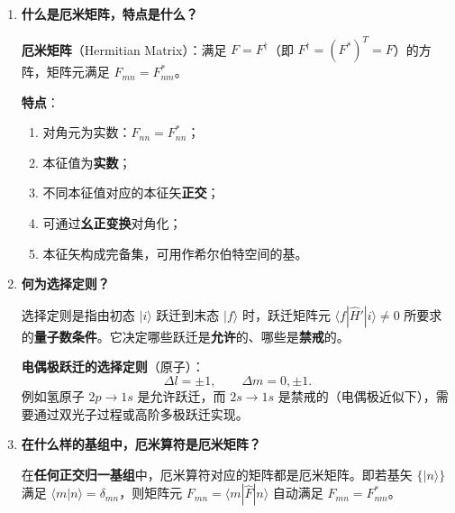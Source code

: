 \begin{enumerate}[label=\textbf{\arabic*.}, leftmargin=2em, itemsep=0.8em]
\textbf{不一定}。若 $[\hat{A},\hat{B}]=0$，则 $\hat{A}$ 和 $\hat{B}$ 具有\textbf{完备的共同本征函数系}，\textbf{原则上}可以同时被精确测定。但"同时确定"还取决于体系所处的\textbf{具体状态}：
\begin{itemize}[nosep]
    \item 若体系处于 $\hat{A}$ 和 $\hat{B}$ 的某个\textbf{共同本征态}，则两者同时具有确定值；
    \item 若体系处于叠加态（如 $\hat{A}$ 存在简并，态是若干简并本征态的叠加），则即使 $[\hat{A},\hat{B}]=0$，$\hat{B}$ 也可能不确定。
\end{itemize}
简言之：对易保证\textbf{可以}同时测定，不等于\textbf{一定}同时确定——后者取决于态的具体形式。

\item \textbf{什么是厄米矩阵，特点是什么？}

\textbf{厄米矩阵}（Hermitian Matrix）：满足 $F = F^\dagger$（即 $F^\dagger = (F^*)^T = F$）的方阵，矩阵元满足 $F_{mn} = F_{nm}^*$。

\textbf{特点}：
\begin{enumerate}[nosep, label=(\arabic*)]
    \item 对角元为实数：$F_{nn} = F_{nn}^*$；
    \item 本征值为\textbf{实数}；
    \item 不同本征值对应的本征矢\textbf{正交}；
    \item 可通过\textbf{幺正变换}对角化；
    \item 本征矢构成完备集，可用作希尔伯特空间的基。
\end{enumerate}

\item \textbf{何为选择定则？}

选择定则是指由初态 $|i\rangle$ 跃迁到末态 $|f\rangle$ 时，跃迁矩阵元 $\langle f|\hat{H}'|i\rangle \neq 0$ 所要求的\textbf{量子数条件}。它决定哪些跃迁是\textbf{允许}的、哪些是\textbf{禁戒}的。

\textbf{电偶极跃迁的选择定则}（原子）：
\[
    \Delta l = \pm 1, \qquad \Delta m = 0, \pm 1.
\]
例如氢原子 $2p\to 1s$ 是允许跃迁，而 $2s\to 1s$ 是禁戒的（电偶极近似下），需要通过双光子过程或高阶多极跃迁实现。

\item \textbf{在什么样的基组中，厄米算符是厄米矩阵？}

在\textbf{任何正交归一基组}中，厄米算符对应的矩阵都是厄米矩阵。即若基矢 $\{|n\rangle\}$ 满足 $\langle m|n\rangle = \delta_{mn}$，则矩阵元 $F_{mn} = \langle m|\hat{F}|n\rangle$ 自动满足 $F_{mn} = F_{nm}^*$。


\end{enumerate}
